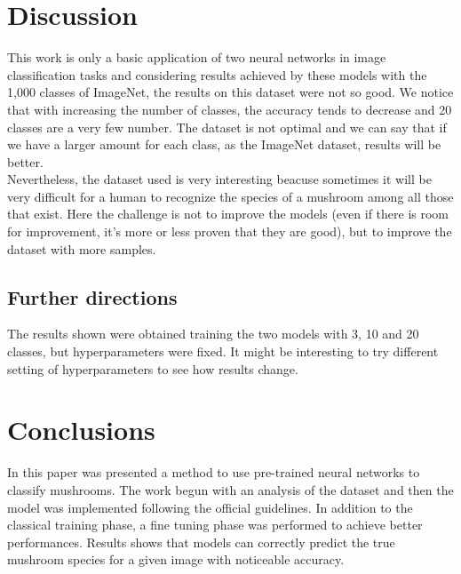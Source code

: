 \documentclass[12pt]{llncs}
\begin{document}
\section{Discussion}
This work is only a basic application of two neural networks in image classification tasks and considering results achieved by these models with the 1,000 classes of ImageNet, the results on this dataset were not so good. We notice that with increasing the number of classes, the accuracy tends to decrease and 20 classes are a very few number. The dataset is not optimal and we can say that if we have a larger amount for each class, as the ImageNet dataset, results will be better.\\
Nevertheless, the dataset used is very interesting beacuse sometimes it will be very difficult for a human to recognize the species of a mushroom among all those that exist. Here the challenge is not to improve the models (even if there is room for improvement, it's more or less proven that they are good), but to improve the dataset with more samples.

\subsection*{Further directions}
The results shown were obtained training the two models with 3, 10 and 20 classes, but hyperparameters were fixed. It might be interesting to try different setting of hyperparameters to see how results change.

\section{Conclusions}
In this paper was presented a method to use pre-trained neural networks to classify mushrooms. The work begun with an analysis of the dataset and then the model was implemented following the official guidelines. In addition to the classical training phase, a fine tuning phase was performed to achieve better performances. Results shows that models can correctly predict the true mushroom species for a given image with noticeable accuracy.

\printbibliography[title={References}]
\end{document}
